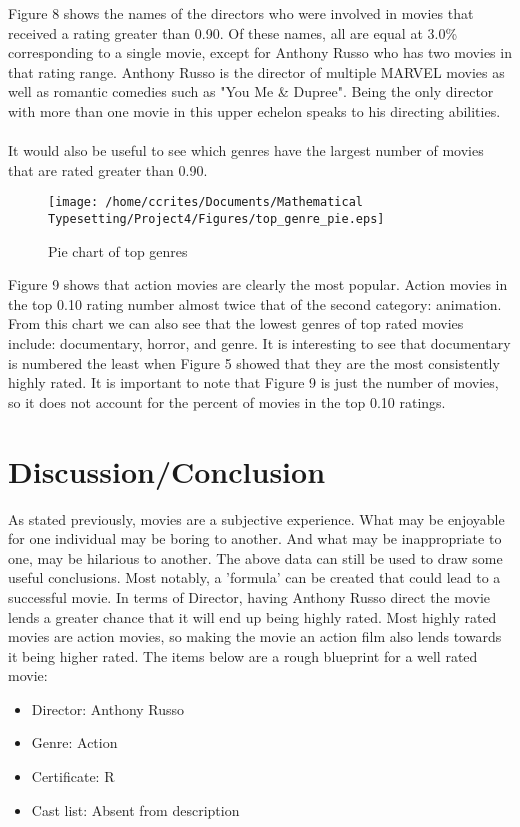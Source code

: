 \documentclass[10pt]{article}
\begin{document}
\bigskip

\par Figure 8 shows the names of the directors who were involved in movies that received a rating greater than 0.90. Of these names, all are equal at 3.0\% corresponding to a single movie, except for Anthony Russo who has two movies in that rating range. Anthony Russo is the director of multiple MARVEL movies as well as romantic comedies such as "You Me \& Dupree". Being the only director with more than one movie in this upper echelon speaks to his directing abilities. \\ \\

\bigskip 
It would also be useful to see which genres have the largest number of movies that are rated greater than 0.90.

\begin{wrapfigure}{r}{0.5\linewidth}
	\texttt{[image: /home/ccrites/Documents/Mathematical Typesetting/Project4/Figures/top\_genre\_pie.eps]}
	\caption{\label{fig9} Pie chart of top genres}
\end{wrapfigure}

Figure 9 shows that action movies are clearly the most popular. Action movies in the top 0.10 rating number almost twice that of the second category: animation. From this chart we can also see that the lowest genres of top rated movies include: documentary, horror, and genre. It is interesting to see that documentary is numbered the least when Figure 5 showed that they are the most consistently highly rated. It is important to note that Figure 9 is just the number of movies, so it does not account for the percent of movies in the top 0.10 ratings.

\section*{Discussion/Conclusion}\label{Sec_Discussion}
\par As stated previously, movies are a subjective experience. What may be enjoyable for one individual may be boring to another. And what may be inappropriate to one, may be hilarious to another. The above data can still be used to draw some useful conclusions.  Most notably, a 'formula' can be created that could lead to a successful movie. In terms of Director, having Anthony Russo direct the movie lends a greater chance that it will end up being highly rated. Most highly rated movies are action movies, so making the movie an action film also lends towards it being higher rated.  The items below are a rough blueprint for a well rated movie:
\begin{itemize}
	\item Director: Anthony Russo
	\item Genre: Action
	\item Certificate: R
	\item Cast list: Absent from description
\end{itemize}
\end{document}
